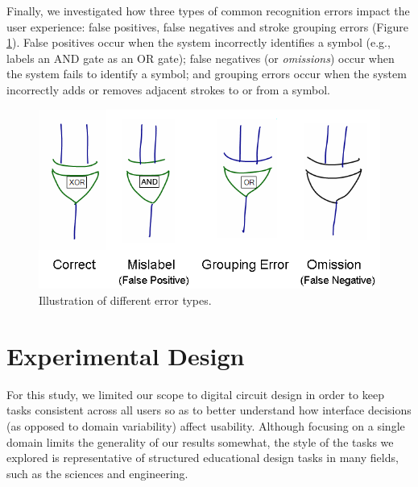 \documentclass{elsart}
\begin{document}


Finally, we investigated how three types of common recognition errors
impact the user experience: false positives, false negatives and
stroke grouping errors (Figure \ref{fig:errorDemo}).  False positives
occur when the system incorrectly identifies a symbol (e.g., labels an
AND gate as an OR gate); false negatives (or \textit{omissions}) occur
when the system fails to identify a symbol; and grouping errors occur
when the system incorrectly adds or removes adjacent strokes to or
from a symbol.


\begin{figure}[tb]
  \centering
  \includegraphics{errorDemo.png}
  \caption{\label{fig:errorDemo}
           Illustration of different error types.}
\end{figure}

\section{Experimental Design}
For this study, we limited our scope to digital circuit design in order
to keep tasks consistent across all users so as to better
understand how interface decisions (as opposed to domain variability)
affect usability.  Although focusing on a single domain limits the
generality of our results somewhat, the style of the tasks we
explored is representative of structured educational design tasks 
in many fields, such as the sciences and engineering.
\end{document}
